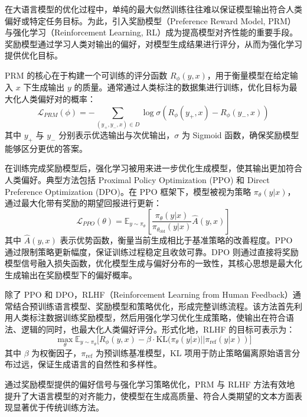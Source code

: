 \documentclass[professional,privacy,print,win,long,STEM,AutoFakeBold]{def/buaa}
\begin{document}
在大语言模型的优化过程中，单纯的最大似然训练往往难以保证模型输出符合人类偏好或特定任务目标。为此，引入奖励模型（Preference Reward Model, PRM）与强化学习（Reinforcement Learning, RL）成为提高模型对齐性能的重要手段。奖励模型通过学习人类对输出的偏好，对模型生成结果进行评分，从而为强化学习提供优化目标。

PRM 的核心在于构建一个可训练的评分函数 \(R_\phi(y, x)\)，用于衡量模型在给定输入 \(x\) 下生成输出 \(y\) 的质量。通常通过人类标注的数据集进行训练，优化目标为最大化人类偏好对的概率：
\begin{equation}
\mathcal{L}_{PRM}(\phi) = - \sum_{(y_+, y_-, x) \in D} \log \sigma(R_\phi(y_+, x) - R_\phi(y_-, x))
\end{equation}
其中 \(y_+\) 与 \(y_-\) 分别表示优选输出与次优输出，\(\sigma\) 为 Sigmoid 函数，确保奖励模型能够区分更优的答案。

在训练完成奖励模型后，强化学习被用来进一步优化生成模型，使其输出更加符合人类偏好。典型方法包括 Proximal Policy Optimization (PPO) 和 Direct Preference Optimization (DPO)。在 PPO 框架下，模型被视为策略 \(\pi_\theta(y|x)\)，通过最大化带有奖励的期望回报进行更新：
\begin{equation}
\mathcal{L}_{PPO}(\theta) = \mathbb{E}_{y \sim \pi_\theta} \left[ \frac{\pi_\theta(y|x)}{\pi_{\theta_\text{old}}(y|x)} \hat{A}(y,x) \right]
\end{equation}
其中 \(\hat{A}(y,x)\) 表示优势函数，衡量当前生成相比于基准策略的改善程度。PPO 通过限制策略更新幅度，保证训练过程稳定且收敛可靠。DPO 则通过直接将奖励模型信号融入损失函数，优化模型生成与偏好分布的一致性，其核心思想是最大化生成输出在奖励模型下的偏好概率。

除了 PPO 和 DPO，RLHF（Reinforcement Learning from Human Feedback）通常结合预训练语言模型、奖励模型和策略优化，形成完整训练流程。该方法首先利用人类标注数据训练奖励模型，然后用强化学习优化生成策略，使输出在符合语法、逻辑的同时，也最大化人类偏好评分。形式化地，RLHF 的目标可表示为：
\begin{equation}
\max_\theta \mathbb{E}_{y \sim \pi_\theta} \big[ R_\phi(y, x) - \beta \cdot \text{KL}(\pi_\theta(y|x) || \pi_\text{ref}(y|x)) \big]
\end{equation}
其中 \(\beta\) 为权衡因子，\(\pi_\text{ref}\) 为预训练基准模型，KL 项用于防止策略偏离原始语言分布过远，保证生成语言的自然性和多样性。

通过奖励模型提供的偏好信号与强化学习策略优化，PRM 与 RLHF 方法有效地提升了大语言模型的对齐能力，使模型在生成高质量、符合人类期望的文本方面表现显著优于传统训练方法。
\end{document}
